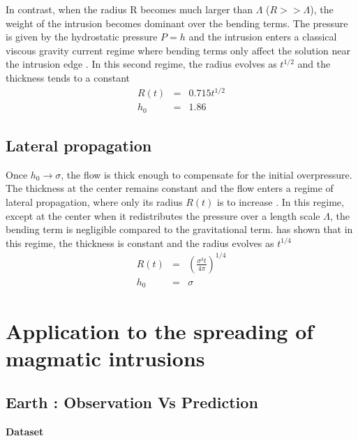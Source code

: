 In  contrast, when  the radius  R becomes  much larger  than $\Lambda$
($R>>\Lambda$), the weight of the  intrusion becomes dominant over the
bending  terms.  The  pressure is  given by  the hydrostatic  pressure
$P = h$  and the intrusion enters a classical  viscous gravity current
regime where bending terms only affect the solution near the intrusion
edge   \citep{Huppert:1982a,Michaut:2011kg,Lister:2013ia}.   In   this
second regime, the radius evolves as $t^{1/2}$ and the thickness tends
to a constant
\begin{eqnarray}
  R(t) &=& 0.715 t^{1/2}\label{Scaling-R-Gravi}\\
  h_0 &=& 1.86\label{Scaling-H-Gravi}
\end{eqnarray} 

\subsection{Lateral propagation}
\label{sec:lateral-propagation}

Once $h_0\rightarrow \sigma$,  the flow is thick  enough to compensate
for  the initial  overpressure. The  thickness at  the center  remains
constant and  the flow enters  a regime of lateral  propagation, where
only its radius $R(t)$ is  to increase \citep{Michaut:2011kg}. In this
regime, except at the center when it redistributes the pressure over a
length scale $\Lambda$, the bending term is negligible compared to the
gravitational  term. \citet{Michaut:2011kg}  has  shown  that in  this
regime, the thickness is constant and the radius evolves as $t^{1/4}$
\begin{eqnarray}
  R(t) &=& \left(\frac{\sigma^3 t}{4\pi}\right)^{1/4}\label{Scaling-R-Propa}\\
  h_0 &=& \sigma\label{Scaling-H-Propa}
\end{eqnarray} 

\section{Application to the spreading of magmatic intrusions}
\label{C2-sec:appl-earth-moon}

\subsection{Earth : Observation Vs Prediction}
\label{sec:observ-vs-pred}

\vspace{.5cm} \textbf{Dataset} \vspace{.5cm}

